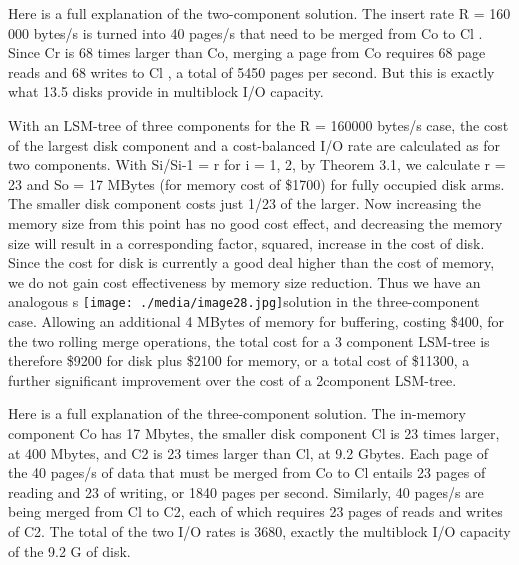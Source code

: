 \documentclass[a4paper,11pt,notitlepage,twoside,openright]{article}
\begin{document}
Here is a full explanation of the two-component solution. The insert
rate R = 160 000 bytes/s is turned into 40 pages/s that need to be
merged from Co to Cl . Since Cr is 68 times larger than Co, merging a
page from Co requires 68 page reads and 68 writes to Cl , a total of
5450 pages per second. But this is exactly what 13.5 disks provide in
multiblock I/O capacity.

With an LSM-tree of three components for the R = 160000 bytes/s case,
the cost of the largest disk component and a cost-balanced I/O rate are
calculated as for two components. With Si/Si-1 = r for i = 1, 2, by
Theorem 3.1, we calculate r = 23 and So = 17 MBytes (for memory cost of
\$1700) for fully occupied disk arms. The smaller disk component costs
just 1/23 of the larger. Now increasing the memory size from this point
has no good cost effect, and decreasing the memory size will result in a
corresponding factor, squared, increase in the cost of disk. Since the
cost for disk is currently a good deal higher than the cost of memory,
we do not gain cost effectiveness by memory size reduction. Thus we have
an analogous s
\texttt{[image: ./media/image28.jpg]}solution
in the three-component case. Allowing an additional 4 MBytes of memory
for buffering, costing \$400, for the two rolling merge operations, the
total cost for a 3 component LSM-tree is therefore \$9200 for disk plus
\$2100 for memory, or a total cost of \$11300, a further significant
improvement over the cost of a 2component LSM-tree.

Here is a full explanation of the three-component solution. The
in-memory component Co has 17 Mbytes, the smaller disk component Cl is
23 times larger, at 400 Mbytes, and C2 is 23 times larger than Cl, at
9.2 Gbytes. Each page of the 40 pages/s of data that must be merged from
Co to Cl entails 23 pages of reading and 23 of writing, or 1840 pages
per second. Similarly, 40 pages/s are being merged from Cl to C2, each
of which requires 23 pages of reads and writes of C2. The total of the
two I/O rates is 3680, exactly the multiblock I/O capacity of the 9.2 G
of disk.
\end{document}
